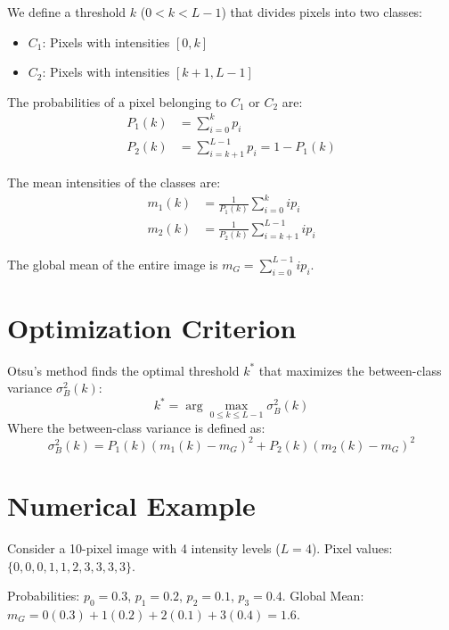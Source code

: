 \documentclass{report}
\begin{document}
We define a threshold $k$ ($0 < k < L-1$) that divides pixels into two classes:
\begin{itemize}
    \item $C_1$: Pixels with intensities $[0, k]$
    \item $C_2$: Pixels with intensities $[k+1, L-1]$
\end{itemize}

The probabilities of a pixel belonging to $C_1$ or $C_2$ are:
\begin{align}
    P_1(k) & = \sum_{i=0}^{k} p_i                  \\
    P_2(k) & = \sum_{i=k+1}^{L-1} p_i = 1 - P_1(k)
\end{align}

The mean intensities of the classes are:
\begin{align}
    m_1(k) & = \frac{1}{P_1(k)} \sum_{i=0}^{k} i p_i     \\
    m_2(k) & = \frac{1}{P_2(k)} \sum_{i=k+1}^{L-1} i p_i
\end{align}

The global mean of the entire image is $m_G = \sum_{i=0}^{L-1} i p_i$.

\section{Optimization Criterion}
Otsu's method finds the optimal threshold $k^*$ that maximizes the between-class variance $\sigma_B^2(k)$:
\begin{equation}
    k^* = \arg\max_{0 \le k \le L-1} \sigma_B^2(k)
\end{equation}
Where the between-class variance is defined as:
\begin{equation}
    \sigma_B^2(k) = P_1(k)(m_1(k) - m_G)^2 + P_2(k)(m_2(k) - m_G)^2
\end{equation}

\section{Numerical Example}
Consider a 10-pixel image with 4 intensity levels ($L=4$).
Pixel values: $\{0, 0, 0, 1, 1, 2, 3, 3, 3, 3\}$.

Probabilities: $p_0 = 0.3$, $p_1 = 0.2$, $p_2 = 0.1$, $p_3 = 0.4$.
Global Mean: $m_G = 0(0.3) + 1(0.2) + 2(0.1) + 3(0.4) = 1.6$.
\end{document}
